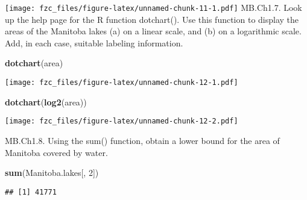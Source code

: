 \documentclass[
]{article}
\newenvironment{Shaded}{\begin{snugshade}}{\end{snugshade}}
\newcommand{\DecValTok}[1]{\textcolor[rgb]{0.00,0.00,0.81}{#1}}
\newcommand{\KeywordTok}[1]{\textcolor[rgb]{0.13,0.29,0.53}{\textbf{#1}}}
\newcommand{\NormalTok}[1]{#1}
\begin{document}
\texttt{[image: fzc\_files/figure-latex/unnamed-chunk-11-1.pdf]}
MB.Ch1.7. Look up the help page for the R function dotchart(). Use this
function to display the areas of the Manitoba lakes (a) on a linear
scale, and (b) on a logarithmic scale. Add, in each case, suitable
labeling information.

\begin{Shaded}
\begin{Highlighting}[]
\KeywordTok{dotchart}\NormalTok{(area)}
\end{Highlighting}
\end{Shaded}

\texttt{[image: fzc\_files/figure-latex/unnamed-chunk-12-1.pdf]}

\begin{Shaded}
\begin{Highlighting}[]
\KeywordTok{dotchart}\NormalTok{(}\KeywordTok{log2}\NormalTok{(area))}
\end{Highlighting}
\end{Shaded}

\texttt{[image: fzc\_files/figure-latex/unnamed-chunk-12-2.pdf]}

MB.Ch1.8. Using the sum() function, obtain a lower bound for the area of
Manitoba covered by water.

\begin{Shaded}
\begin{Highlighting}[]
\KeywordTok{sum}\NormalTok{(Manitoba.lakes[, }\DecValTok{2}\NormalTok{])}
\end{Highlighting}
\end{Shaded}

\begin{verbatim}
## [1] 41771
\end{verbatim}
\end{document}
